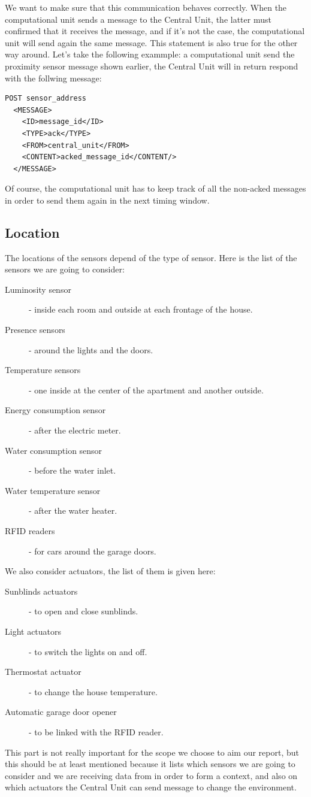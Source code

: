\documentclass{acm_proc_article-sp}
\begin{document}
We want to make sure that this communication behaves correctly. 
When the computational unit sends a message to the Central Unit, the latter must confirmed that it receives the message, and if it's not the case, 
the computational unit will send again the same message. 
This statement is also true for the other way around. 
Let's take the following exammple: a computational unit send the proximity sensor message shown earlier, the Central Unit will in return respond with the follwing message:

\begin{verbatim}
POST sensor_address
  <MESSAGE>
    <ID>message_id</ID>
    <TYPE>ack</TYPE>
    <FROM>central_unit</FROM>
    <CONTENT>acked_message_id</CONTENT/>
  </MESSAGE>
\end{verbatim}

Of course, the computational unit has to keep track of all the non-acked messages in order to send them again in the next timing window.

\subsection{Location}
The locations of the sensors depend of the type of sensor. Here is the list of the sensors we are going to consider:
\begin{description}
 \item[Luminosity sensor] - inside each room and outside at each frontage of the house.
 \item[Presence sensors] - around the lights and the doors.
 \item[Temperature sensors] - one inside at the center of the apartment and another outside.
 \item[Energy consumption sensor] - after the electric meter.
 \item[Water consumption sensor] - before the water inlet.
 \item[Water temperature sensor] - after the water heater.
 \item[RFID readers] - for cars around the garage doors.
\end{description}
We also consider actuators, the list of them is given here:
\begin{description}
 \item[Sunblinds actuators] - to open and close sunblinds.
 \item[Light actuators] - to switch the lights on and off.
 \item[Thermostat actuator] - to change the house temperature.
 \item[Automatic garage door opener] - to be linked with the RFID reader.
\end{description}
This part is not really important for the scope we choose to aim our report, but this should be at least mentioned because it lists which sensors we are going to consider and we are receiving data from in order to form a context, and also on which actuators the Central Unit can send message to change the environment.
\end{document}
